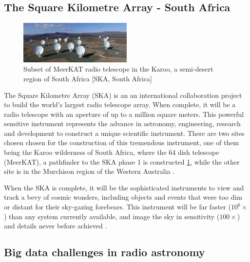 \subsection{The Square Kilometre Array - South Africa}

\begin{figure}[H]
  \centering
    \includegraphics[width=0.5\textwidth]{images/MeerMeer.jpg}
    \caption{Subset of MeerKAT radio telescope in the Karoo, a semi-desert region of South Africa [SKA, South Africa]}
  \label{images/MeerKAT}
\end{figure}

The Square Kilometre Array (SKA) is an an international collaboration project to build the world's largest radio telescope array. When complete, it will be a radio telescope with an aperture of up to a million square meters. This powerful sensitive instrument represents the advance in astronomy, engineering, research and  development to construct a unique scientific instrument. There are two sites chosen chosen for the construction of this tremendous instrument, one of them being the Karoo wilderness of South Africa, where the 64 dish telescope (MeerKAT), a pathfinder to the SKA phase 1 is constructed \ref{images/MeerKAT}, while the other site is in the Murchison region of the Western Australia \citep{hall2008square}.  

When the SKA is complete, it will be the sophisticated instruments to view and track a bevy of cosmic wonders, including objects and events that were too dim or distant for their sky-gazing forebears. This instrument will be far faster ($10^6\times$) than any system currently available, and image the sky in sensitivity ($100\times$) and details never before achieved \citep{staats2016genetic}.

\subsection{Big data challenges in radio astronomy}


